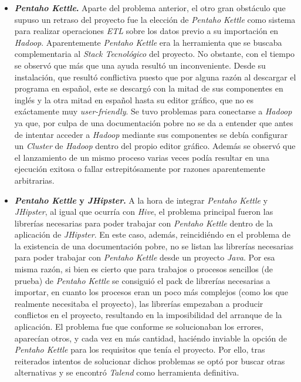 \begin{itemize}
\item \textbf{\textit{Pentaho Kettle}.} Aparte del problema anterior, el otro gran obstáculo que supuso un retraso del proyecto fue la elección de \textit{Pentaho Kettle} como sistema para realizar operaciones \textit{ETL} sobre los datos previo a su importación en \textit{Hadoop}. Aparentemente \textit{Pentaho Kettle} era la herramienta que se buscaba complementaria al \textit{Stack Tecnológico} del proyecto. No obstante, con el tiempo se observó que más que una ayuda resultó un inconveniente. Desde su instalación, que resultó conflictiva puesto que por alguna razón al descargar el programa en español, este se descargó con la mitad de sus componentes en inglés y la otra mitad en español hasta su editor gráfico, que no es exáctamente muy \textit{user-friendly}. Se tuvo problemas para conectarse a \textit{Hadoop} ya que, por culpa de una documentación pobre no se da a entender que antes de intentar acceder a \textit{Hadoop} mediante sus componentes se debía configurar un \textit{Cluster} de \textit{Hadoop} dentro del propio editor gráfico. Además se observó que el lanzamiento de un mismo proceso varias veces podía resultar en una ejecución exitosa o fallar estrepitósamente por razones aparentemente arbitrarias. 

\item \textbf{\textit{Pentaho Kettle} y \textit{JHipster}.} A la hora de integrar \textit{Pentaho Kettle} y \textit{JHipster}, al igual que ocurría con \textit{Hive}, el problema principal fueron las librerías necesarias para poder trabajar con \textit{Pentaho Kettle} dentro de la aplicación de \textit{JHipster}. En este caso, además, reincidiéndo en el problema de la existencia de una documentación pobre, no se listan las librerías necesarias para poder trabajar con \textit{Pentaho Kettle} desde un proyecto \textit{Java}. Por esa misma razón, si bien es cierto que para trabajos o procesos sencillos (de prueba) de \textit{Pentaho Kettle} se consiguió el pack de librerías necesarias a importar, en cuanto los procesos eran un poco más complejos (como los que realmente necesitaba el proyecto), las librerías empezaban a producir conflictos en el proyecto, resultando en la imposibilidad del arranque de la aplicación. El problema fue que conforme se solucionaban los errores, aparecían otros, y cada vez en más cantidad, haciéndo inviable la opción de \textit{Pentaho Kettle} para los requisitos que tenía el proyecto. Por ello, tras reiterados intentos de solucionar dichos problemas se optó por buscar otras alternativas y se encontró \textit{Talend} como herramienta definitiva.


\end{itemize}
